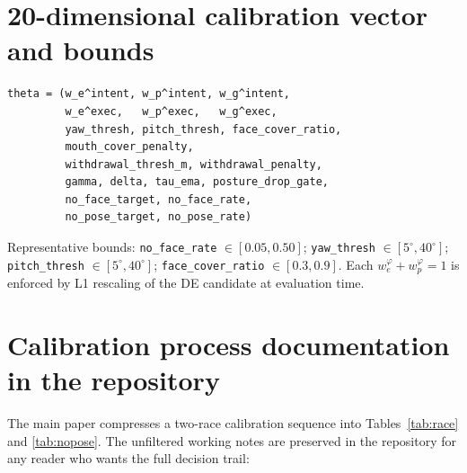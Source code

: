 \documentclass{article}
\newcommand{\code}[1]{\texttt{\small #1}}
\begin{document}
\section{20-dimensional calibration vector and bounds}\label{app:bounds}

\begin{lstlisting}
theta = (w_e^intent, w_p^intent, w_g^intent,
         w_e^exec,   w_p^exec,   w_g^exec,
         yaw_thresh, pitch_thresh, face_cover_ratio,
         mouth_cover_penalty,
         withdrawal_thresh_m, withdrawal_penalty,
         gamma, delta, tau_ema, posture_drop_gate,
         no_face_target, no_face_rate,
         no_pose_target, no_pose_rate)
\end{lstlisting}
Representative bounds: \code{no\_face\_rate} $\in [0.05, 0.50]$; \code{yaw\_thresh} $\in [5^\circ, 40^\circ]$; \code{pitch\_thresh} $\in [5^\circ, 40^\circ]$; \code{face\_cover\_ratio} $\in [0.3, 0.9]$. Each $w_e^\varphi + w_p^\varphi = 1$ is enforced by L1 rescaling of the DE candidate at evaluation time.

\section{Calibration process documentation in the repository}\label{app:process}

The main paper compresses a two-race calibration sequence into Tables~\ref{tab:race} and \ref{tab:nopose}. The unfiltered working notes are preserved in the repository for any reader who wants the full decision trail:
\end{document}

